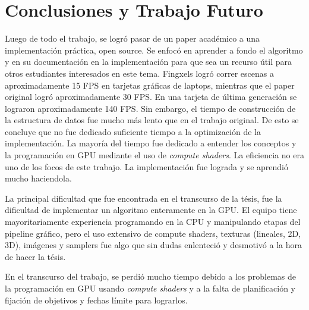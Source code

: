 \graphicspath{{chapters/6_conclusión/figures/}}

\chapter{Conclusiones y Trabajo Futuro}\label{chap:conclusions}

Luego de todo el trabajo, se logró pasar de un paper académico a una implementación práctica, open source.
Se enfocó en aprender a fondo el algoritmo y en su documentación en la implementación para que sea un recurso útil para otros estudiantes interesados en este tema.
Fingxels logró correr escenas a aproximadamente 15 FPS en tarjetas gráficas de laptops, mientras que el paper original logró aproximadamente 30 FPS.
En una tarjeta de última generación se lograron aproximadamente 140 FPS.
Sin embargo, el tiempo de construcción de la estructura de datos fue mucho más lento que en el trabajo original.
De esto se concluye que no fue dedicado suficiente tiempo a la optimización de la implementación.
La mayoría del tiempo fue dedicado a entender los conceptos y la programación en GPU mediante el uso de \textit{compute shaders}.
La eficiencia no era uno de los focos de este trabajo.
La implementación fue lograda y se aprendió mucho haciendola.

La principal dificultad que fue encontrada en el transcurso de la tésis, fue la dificultad de implementar un algoritmo enteramente en la GPU.
El equipo tiene mayoritariamente experiencia programando en la CPU y manipulando etapas del pipeline gráfico, pero el uso extensivo de compute shaders, texturas (lineales, 2D, 3D), imágenes y samplers fue algo que sin dudas enlenteció y desmotivó a la hora de hacer la tésis.

En el transcurso del trabajo, se perdió mucho tiempo debido a los problemas de la programación en GPU usando \textit{compute shaders} y a la falta de planificación y fijación de objetivos y fechas límite para lograrlos.


